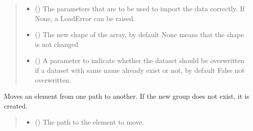 \documentclass[letterpaper,10pt,english]{sphinxmanual}
\begin{document}
\begin{fulllineitems}
\begin{fulllineitems}
\begin{quote}
\begin{description}
\begin{itemize}
\item {} 
\sphinxAtStartPar
{} (\sphinxstyleliteralemphasis{\sphinxupquote{, }}) \textendash{} The parameters that are to be used to import the data correctly.  If None, a LoadError can be raised.

\item {} 
\sphinxAtStartPar
{} (\sphinxstyleliteralemphasis{\sphinxupquote{, }}) \textendash{} The new shape of the array, by default None means that the shape is not changed

\item {} 
\sphinxAtStartPar
{} (\sphinxstyleliteralemphasis{\sphinxupquote{, }}) \textendash{} A parameter to indicate whether the dataset should be overwritten if a dataset with same name already exist or not, by default False \sphinxhyphen{} not overwritten.

\end{itemize}

\end{description}\end{quote}

\end{fulllineitems}


\begin{fulllineitems}
\label{\detokenize{_autosummary/HDF5_BLS.wrapper:HDF5_BLS.wrapper.Wrapper.move}}
\pysigstartsignatures
\pysiglinewithargsret
{}
{\sphinxparamcomma {}}
{}
\pysigstopsignatures
\sphinxAtStartPar
Moves an element from one path to another. If the new group does not exist, it is created.
\begin{quote}\begin{description}
\begin{itemize}
\item {} 
\sphinxAtStartPar
{} () \textendash{} The path to the element to move.


\end{itemize}
\end{description}
\end{quote}
\end{fulllineitems}
\end{fulllineitems}
\end{document}

